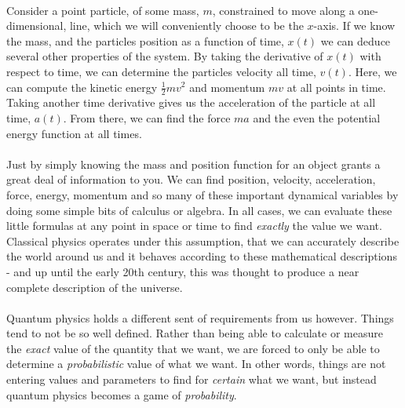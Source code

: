 \documentclass[12pt,letterpaper]{book}
\begin{document}

\paragraph*{}Consider a point particle, of some mass, $m$, constrained to move along a one-dimensional, line, which we will conveniently choose to be the $x$-axis. If we know the mass, and the particles position as a function of time, $x(t)$ we can deduce several other properties of the system. By taking the derivative of $x(t)$ with respect to time, we can determine the particles velocity all time, $v(t)$. Here, we can compute the kinetic energy $\frac{1}{2}mv^2$ and momentum $mv$ at all points in time. Taking another time derivative gives us the acceleration of the particle at all time, $a(t)$. From there, we can find the force $ma$ and the even the potential energy function at all times. 
\paragraph*{}Just by simply knowing the mass and position function for an object grants a great deal of information to you. We can find position, velocity, acceleration, force, energy, momentum and so many of these important dynamical variables by doing some simple bits of calculus or algebra. In all cases, we can evaluate these little formulas at any point in space or time to find \textit{exactly} the value we want. Classical physics operates under this assumption, that we can accurately describe the world around us and it behaves according to these mathematical descriptions - and up until the early 20th century, this was thought to produce a near complete description of the universe.
\paragraph*{}Quantum physics holds a different sent of requirements from us however. Things tend to not be so well defined. Rather than being able to calculate or measure the \textit{exact} value of the quantity that we want, we are forced to only be able to determine a \textit{probabilistic} value of what we want. In other words, things are not entering values and parameters to find for \textit{certain} what we want, but instead quantum physics becomes a game of \textit{probability}.
\end{document}
